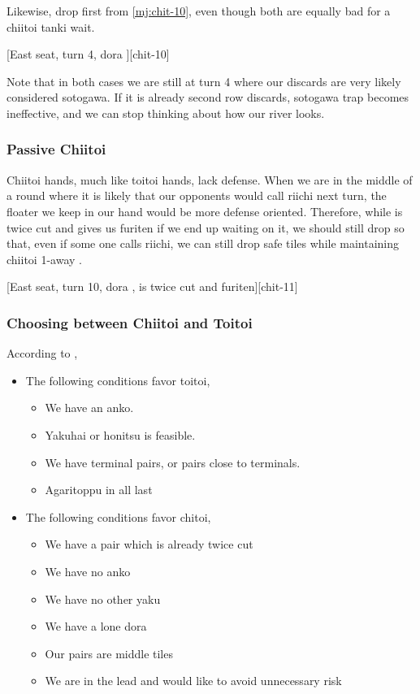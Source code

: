 \documentclass[12pt]{article}
\begin{document}
Likewise, drop  first from \ref{mj:chit-10}, even though both  are equally bad for a chiitoi tanki wait.

[East seat, turn 4, dora ][chit-10]

Note that in both cases we are still at turn 4 where our discards are very likely considered sotogawa. If it is already second row discards, sotogawa trap becomes ineffective, and we can stop thinking about how our river looks.


\subsubsection*{Passive Chiitoi}

Chiitoi hands, much like toitoi hands, lack defense. When we are in the middle of a round where it is likely that our opponents would call riichi next turn, the floater we keep in our hand would be more defense oriented. Therefore, while  is twice cut and gives us furiten if we end up waiting on it, we should still drop  so that, even if some one calls riichi, we can still drop safe tiles while maintaining chiitoi 1-away \citep[][p.~85]{zero-teyaku}.

[East seat, turn 10, dora ,  is twice cut and furiten][chit-11]


\subsubsection*{Choosing between Chiitoi and Toitoi}

According to \citet{gendai-toitoi},

\begin{itemize}
  \item The following conditions favor toitoi,
  \begin{itemize}
    \item We have an anko.
    \item Yakuhai or honitsu is feasible.
    \item We have terminal pairs, or pairs close to terminals.
    \item Agaritoppu in all last
  \end{itemize}
  \item The following conditions favor chitoi,
  \begin{itemize}
    \item We have a pair which is already twice cut
    \item We have no anko
    \item We have no other yaku
    \item We have a lone dora
    \item Our pairs are middle tiles
    \item We are in the lead and would like to avoid unnecessary risk
  \end{itemize}
\end{itemize}
\end{document}

